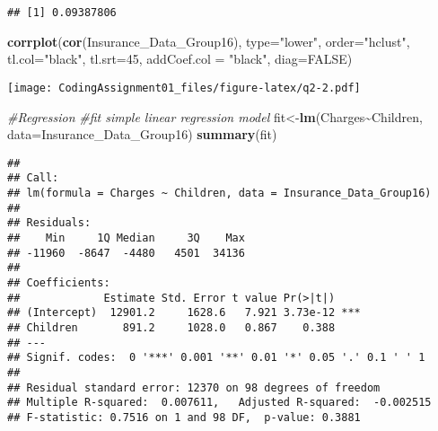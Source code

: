 \documentclass[
]{article}
\newenvironment{Shaded}{\begin{snugshade}}{\end{snugshade}}
\newcommand{\AttributeTok}[1]{\textcolor[rgb]{0.13,0.29,0.53}{#1}}
\newcommand{\CommentTok}[1]{\textcolor[rgb]{0.56,0.35,0.01}{\textit{#1}}}
\newcommand{\ConstantTok}[1]{\textcolor[rgb]{0.56,0.35,0.01}{#1}}
\newcommand{\DecValTok}[1]{\textcolor[rgb]{0.00,0.00,0.81}{#1}}
\newcommand{\FunctionTok}[1]{\textcolor[rgb]{0.13,0.29,0.53}{\textbf{#1}}}
\newcommand{\NormalTok}[1]{#1}
\newcommand{\OtherTok}[1]{\textcolor[rgb]{0.56,0.35,0.01}{#1}}
\newcommand{\SpecialCharTok}[1]{\textcolor[rgb]{0.81,0.36,0.00}{\textbf{#1}}}
\newcommand{\StringTok}[1]{\textcolor[rgb]{0.31,0.60,0.02}{#1}}
\begin{document}
\begin{Shaded}
\end{Shaded}

\begin{verbatim}
## [1] 0.09387806
\end{verbatim}

\begin{Shaded}
\begin{Highlighting}[]
\FunctionTok{corrplot}\NormalTok{(}\FunctionTok{cor}\NormalTok{(Insurance\_Data\_Group16),}
\AttributeTok{type=}\StringTok{"lower"}\NormalTok{,}
\AttributeTok{order=}\StringTok{"hclust"}\NormalTok{,}
\AttributeTok{tl.col=}\StringTok{"black"}\NormalTok{,}
\AttributeTok{tl.srt=}\DecValTok{45}\NormalTok{,}
\AttributeTok{addCoef.col =} \StringTok{"black"}\NormalTok{,}
\AttributeTok{diag=}\ConstantTok{FALSE}\NormalTok{)}
\end{Highlighting}
\end{Shaded}

\texttt{[image: CodingAssignment01\_files/figure-latex/q2-2.pdf]}

\begin{Shaded}
\begin{Highlighting}[]
\CommentTok{\#Regression }
\CommentTok{\#fit simple linear regression model}
\NormalTok{fit}\OtherTok{\textless{}{-}}\FunctionTok{lm}\NormalTok{(Charges}\SpecialCharTok{\textasciitilde{}}\NormalTok{Children, }\AttributeTok{data=}\NormalTok{Insurance\_Data\_Group16)}
\FunctionTok{summary}\NormalTok{(fit)}
\end{Highlighting}
\end{Shaded}

\begin{verbatim}
## 
## Call:
## lm(formula = Charges ~ Children, data = Insurance_Data_Group16)
## 
## Residuals:
##    Min     1Q Median     3Q    Max 
## -11960  -8647  -4480   4501  34136 
## 
## Coefficients:
##             Estimate Std. Error t value Pr(>|t|)    
## (Intercept)  12901.2     1628.6   7.921 3.73e-12 ***
## Children       891.2     1028.0   0.867    0.388    
## ---
## Signif. codes:  0 '***' 0.001 '**' 0.01 '*' 0.05 '.' 0.1 ' ' 1
## 
## Residual standard error: 12370 on 98 degrees of freedom
## Multiple R-squared:  0.007611,   Adjusted R-squared:  -0.002515 
## F-statistic: 0.7516 on 1 and 98 DF,  p-value: 0.3881
\end{verbatim}
\end{document}
